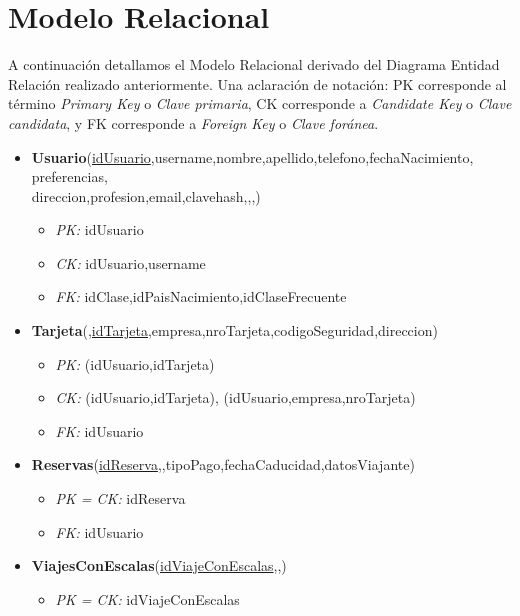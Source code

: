 \section{Modelo Relacional}

A continuaci\'on detallamos el Modelo Relacional derivado del
Diagrama Entidad Relaci\'on realizado anteriormente. Una aclaraci\'on
de notaci\'on: PK corresponde al t\'ermino \textit{Primary Key} o \textit{Clave primaria},
CK corresponde a \textit{Candidate Key} o \textit{Clave candidata}, y FK corresponde a
\textit{Foreign Key} o \textit{Clave for\'anea}.

\begin{itemize}
	\item \textbf{Usuario}(\underline{idUsuario},username,nombre,apellido,telefono,fechaNacimiento,
	preferencias,\\ direccion,profesion,email,clavehash,,,)
		\begin{itemize}
			\item \textit{PK:} idUsuario
			\item \textit{CK:} idUsuario,username
			\item \textit{FK:} idClase,idPaisNacimiento,idClaseFrecuente
		\end{itemize}
	\item \textbf{Tarjeta}(\underline{,idTarjeta},empresa,nroTarjeta,codigoSeguridad,direccion)
		\begin{itemize}
			\item \textit{PK:} (idUsuario,idTarjeta)
			\item \textit{CK:} (idUsuario,idTarjeta), (idUsuario,empresa,nroTarjeta)
			\item \textit{FK:} idUsuario
		\end{itemize}
	\item \textbf{Reservas}(\underline{idReserva},,tipoPago,fechaCaducidad,datosViajante)
		\begin{itemize}
			\item \textit{PK = CK:} idReserva
			\item \textit{FK:} idUsuario
		\end{itemize}
	\item \textbf{ViajesConEscalas}(\underline{idViajeConEscalas},,)
		\begin{itemize}
			\item \textit{PK = CK:} idViajeConEscalas

\end{itemize}
\end{itemize}
